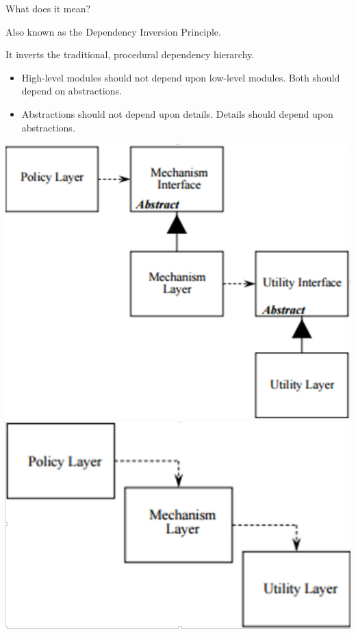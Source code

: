 \documentclass{beamer}
\begin{document}
\begin{frame}{What does it mean?}
    \par Also known as the Dependency Inversion Principle.
    \par It inverts the traditional, procedural dependency hierarchy.
    \begin{itemize}
        \item High-level modules should not depend upon low-level modules. Both should depend on abstractions.
        \item Abstractions should not depend upon details. Details should depend upon abstractions.
    \end{itemize}
    \includegraphics{abstractions-not-concrete-classes-01}
    \includegraphics{abstractions-not-concrete-classes-02}
\end{frame}
\end{document}
